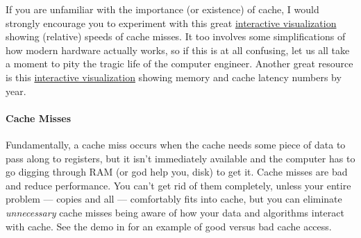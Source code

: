 If you are unfamiliar with the importance (or existence) of cache, I would 
strongly encourage you to experiment with this great
\href{http://www.overbyte.com.au/misc/Lesson3/CacheFun.html}%
{interactive visualization} 
showing (relative) speeds of cache misses. It too involves some simplifications 
of how modern hardware actually works, so if this is at all confusing, let us 
all take a moment to pity the tragic life of the computer engineer.  Another 
great resource is this
\href{http://www.eecs.berkeley.edu/~rcs/research/interactive_latency.html}%
{interactive visualization} showing memory and cache latency numbers by year.





\paragraph{Cache Misses} Fundamentally, a cache miss occurs when the cache 
needs some piece of data to pass along to registers, but it isn't immediately 
available and the computer has to go digging through RAM (or god help you, 
disk) to get it.  Cache misses are bad and reduce performance.  You can't get 
rid of them completely, unless your entire problem --- copies and all --- 
comfortably fits into cache, but you can eliminate \emph{unnecessary} cache 
misses being aware of how your data and algorithms interact with cache.  See 
the demo  in \thispackage for an example of good versus 
bad cache access.
